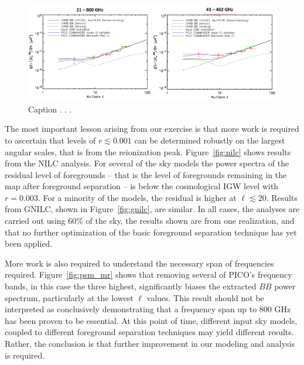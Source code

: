 \documentclass[PICOReport.tex]{subfiles}
\begin{document}

\begin{figure}
\hspace{-0.1in}
\parbox{4.5in}{\centerline {
\includegraphics[width=4.5in]{images/commander_foregrounds_BB.png}}}
\hspace{0.in}
\parbox{2.0in}{
\caption{Caption . . .  \dotfill
\label{fig:commander}}}
\vspace{-0.1in}
\end{figure}

The most important lesson arising from our exercise is that more work is required to ascertain that levels of $r \lesssim 0.001$ can be determined robustly on the largest angular scales, that is from the reionization peak.  Figure~\ref{fig:nilc} shows results from the NILC analysis. For several of the sky models the power spectra of the residual level of foregrounds -- that is the level of foregrounds remaining in the map after foreground separation -- is below the cosmological \ac{IGW} level with $r =0.003$. For a minority of the models, the residual is higher at $\ell \lesssim 20$. Results from GNILC, shown in Figure~\ref{fig:gnilc}, are similar. In all cases, the analyses are carried out using 60\% of the sky, the results shown are from one realization, and that no further optimization of the basic foreground separation technique has yet been applied. 

More work is also required to understand the necessary span of frequencies required. Figure~\ref{fig:psm_mr} shows that removing several of PICO's frequency bands, in this case the three highest, significantly biases the extracted $BB$ power spectrum, particularly at the lowest $\ell$ values. This result should not be interpreted as conclusively demonstrating that a frequency span up to 800 GHz has been proven to be essential. At this point of time, different input sky models, coupled to different foreground separation techniques may yield different results. Rather, the conclusion is that further improvement in our modeling and analysis is required. 
\end{document}
